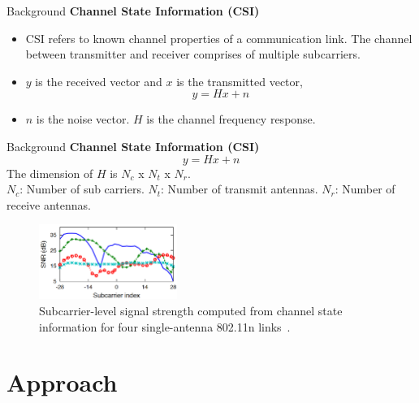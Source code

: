 \documentclass{beamer}
\begin{document}
\begin{frame}{Background}
\textbf{Channel State Information (CSI)}\\
	\begin{itemize}
		\item CSI refers to known channel properties of a communication link. The channel between transmitter and receiver comprises of multiple subcarriers. 
		\item $y$ is the received vector and $x$ is the transmitted vector,
		\begin{equation*}
			y=Hx + n
		\end{equation*}
		\item $n$ is the noise vector. $H$ is the channel frequency response. 
	\end{itemize}
\end{frame}

\begin{frame}{Background}
\textbf{Channel State Information (CSI)}\\	
	\begin{equation*}
		y=Hx + n
	\end{equation*}
The dimension of $H$ is $N_c$ x $N_t$ x $N_r$.\\
\vspace{10px}
$N_c$: Number of sub carriers. $N_t$: Number of transmit antennas. $N_r$: Number of receive antennas.\\
\begin{figure}[H]
		\centering
		\includegraphics[width=0.4\textwidth]{Images/csi.png}
		\caption{Subcarrier-level signal strength computed from channel state information for four single-antenna 802.11n links~\cite{halperin2011tool}.}
	\end{figure}
\end{frame}








\section{Approach}
\end{document}
